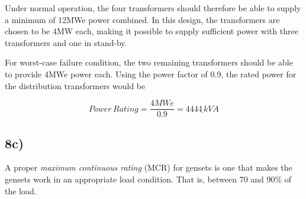 Under normal operation, the four transformers should therefore be able to supply a minimum of 12MWe power combined. In this design, the transformers are chosen to be 4MW each, making it possible to supply sufficient power with three transformers and one in stand-by. 

For worst-case failure condition, the two remaining transformers should be able to provide 4MWe power each. Using the power factor of 0.9, the rated power for the distribution transformers would be 

\[
Power\, Rating=\frac{4MWe}{0.9}=\underline{4444\,kVA}
\]








\subsection*{8c)}

A proper \textit{maximum continuous rating} (MCR) for gensets is one that makes the gensets work in an appropriate load condition. That is, between 70 and 90\% of the load.  

